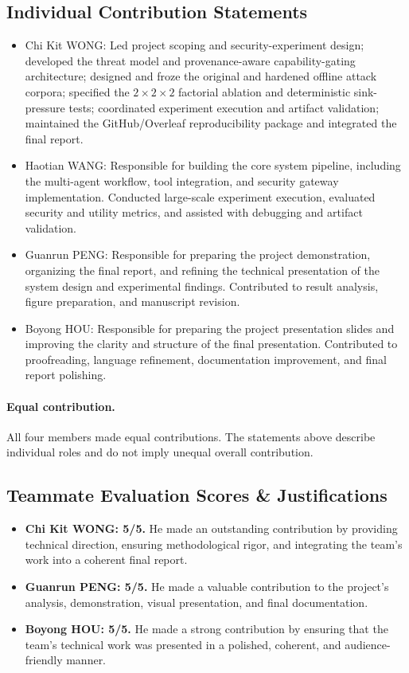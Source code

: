 \documentclass[journal]{IEEEtran}
\begin{document}
\subsection{Individual Contribution Statements}

\begin{itemize}[nosep]
  \item Chi Kit WONG: Led project scoping and security-experiment design; developed the threat model and provenance-aware capability-gating architecture; designed and froze the original and hardened offline attack corpora; specified the $2 \times 2 \times 2$ factorial ablation and deterministic sink-pressure tests; coordinated experiment execution and artifact validation; maintained the GitHub/Overleaf reproducibility package and integrated the final report.
  \item Haotian WANG: Responsible for building the core system pipeline,
including the multi-agent workflow, tool integration, and security
gateway implementation. Conducted large-scale experiment execution,
evaluated security and utility metrics, and assisted with debugging and
artifact validation.
  \item Guanrun PENG: Responsible for preparing the project demonstration,
organizing the final report, and refining the technical presentation of
the system design and experimental findings. Contributed to result
analysis, figure preparation, and manuscript revision.
  \item Boyong HOU: Responsible for preparing the project presentation slides
and improving the clarity and structure of the final presentation.
Contributed to proofreading, language refinement, documentation
improvement, and final report polishing.
\end{itemize}

\paragraph{Equal contribution.}
All four members made equal contributions. The statements above describe
individual roles and do not imply unequal overall contribution.
\subsection{Teammate Evaluation Scores \& Justifications}

\begin{itemize}
    \item \textbf{Chi Kit WONG: 5/5.}
He made an outstanding contribution by providing technical direction, ensuring methodological rigor, and integrating the team’s work into a coherent final report.
    
    \item \textbf{Guanrun PENG: 5/5.}
He made a valuable contribution to the project’s analysis, demonstration, visual presentation, and final documentation.

    \item \textbf{Boyong HOU: 5/5.}
    He made a strong contribution by ensuring that the team’s technical work was presented in a polished, coherent, and audience-friendly manner.
\end{itemize}
\end{document}
